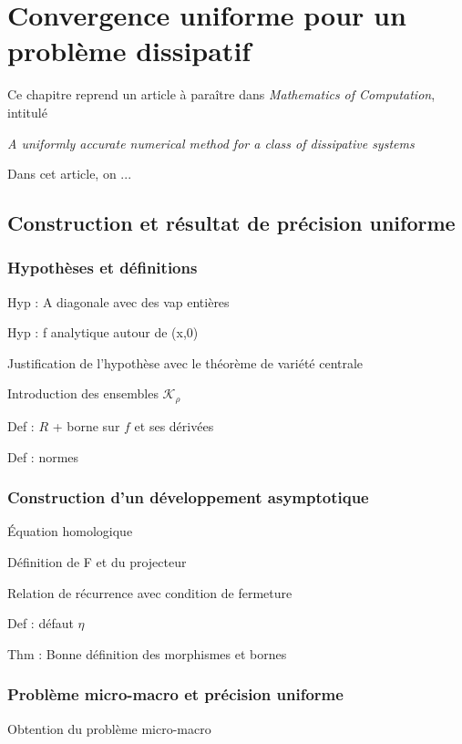 
\clearemptydoublepage
\chapter{Convergence uniforme pour un problème dissipatif}

Ce chapitre reprend un article à paraître dans \textit{Mathematics of
Computation}, intitulé 
\begin{center}\itshape%
  A uniformly accurate numerical method for a class of dissipative
  systems
\end{center}
Dans cet article, on ...



\section{Construction et résultat de précision uniforme}

\subsection{Hypothèses et définitions}

Hyp : A diagonale avec des vap entières

Hyp : f analytique autour de (x,0)

Justification de l’hypothèse avec le théorème de variété centrale

Introduction des ensembles $\mathcal{K}_{\rho}$

Def : $R$ + borne sur $f$ et ses dérivées

Def : normes


\subsection{Construction d'un développement asymptotique}

Équation homologique

Définition de F et du projecteur

Relation de récurrence avec condition de fermeture

Def : défaut $\eta$

Thm : Bonne définition des morphismes et bornes


\subsection{Problème micro-macro et précision uniforme}

Obtention du problème micro-macro

